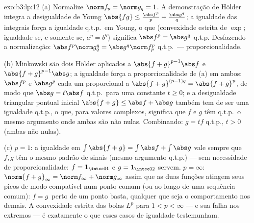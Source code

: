 \begin{solution}{exo:b3:lp:12}
(a) Normalize $\norm f_p = \norm g_q = 1$. A demonstração de
Hölder integra a desigualdade de Young $\abs{fg} \leq
\frac{\abs f^p}p + \frac{\abs g^q}q$; a igualdade das
integrais força a igualdade q.t.p.\ em Young, o que (convexidade
estrita de $\exp$; igualdade se, e somente se, $a^p = b^q$) significa $\abs
f^p = \abs g^q$ q.t.p. Desfazendo a normalização:
$\abs f^p\norm g_q^q = \abs g^q\norm f_p^p$ q.t.p.\ ---
proporcionalidade.

(b) Minkowski são dois Hölder aplicados a $\abs{f + g}^{p-1}
\abs f$ e $\abs{f+g}^{p-1}\abs g$; a igualdade força a
proporcionalidade de (a) em ambos: $\abs f^p$ e $\abs g^p$ cada um
proporcional a $\abs{f+g}^{(p-1)q} = \abs{f+g}^p$, de modo que
$\abs g = t\abs f$ q.t.p.\ para uma constante $t \geq 0$; e a
desigualdade triangular pontual inicial $\abs{f + g} \leq
\abs f + \abs g$ também tem de ser uma igualdade q.t.p., o que, para
valores complexos, significa que $f$ e $g$ têm q.t.p.\ o mesmo
argumento onde ambas são não nulas. Combinando: $g = tf$ q.t.p.,
$t > 0$ (ambas não nulas).

(c) $p = 1$: a igualdade em $\int\abs{f + g} = \int\abs f +
\int\abs g$ vale sempre que $f, g$ têm o mesmo padrão de
sinais (mesmo argumento q.t.p.) --- sem necessidade de proporcionalidade:
$f = \mathbf 1_{\intcc01}$ e $g = \mathbf 1_{\intcc02}$
servem. $p = \infty$: $\norm{f+g}_\infty = \norm f_\infty +
\norm g_\infty$ assim que as duas funções atingem seus picos de modo
compatível num ponto comum (ou ao longo de uma sequência comum):
$f = g\,$ perto de um ponto basta, qualquer que seja o comportamento
nos demais. A convexidade estrita das bolas $L^p$ para $1 <
p < \infty$ --- e sua falha nos extremos --- é
exatamente o que esses casos de igualdade testemunham.
\end{solution}

